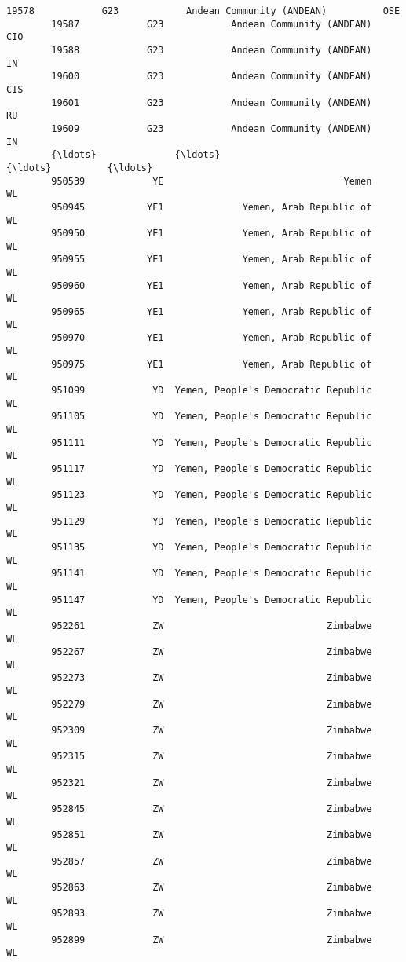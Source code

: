 \documentclass[11pt]{article}
\begin{document}
\begin{Verbatim}[commandchars=\\\{\}]
        19578            G23            Andean Community (ANDEAN)          OSE   
        19587            G23            Andean Community (ANDEAN)          CIO   
        19588            G23            Andean Community (ANDEAN)           IN   
        19600            G23            Andean Community (ANDEAN)          CIS   
        19601            G23            Andean Community (ANDEAN)           RU   
        19609            G23            Andean Community (ANDEAN)           IN   
        {\ldots}              {\ldots}                                  {\ldots}          {\ldots}   
        950539            YE                                Yemen           WL   
        950945           YE1              Yemen, Arab Republic of           WL   
        950950           YE1              Yemen, Arab Republic of           WL   
        950955           YE1              Yemen, Arab Republic of           WL   
        950960           YE1              Yemen, Arab Republic of           WL   
        950965           YE1              Yemen, Arab Republic of           WL   
        950970           YE1              Yemen, Arab Republic of           WL   
        950975           YE1              Yemen, Arab Republic of           WL   
        951099            YD  Yemen, People's Democratic Republic           WL   
        951105            YD  Yemen, People's Democratic Republic           WL   
        951111            YD  Yemen, People's Democratic Republic           WL   
        951117            YD  Yemen, People's Democratic Republic           WL   
        951123            YD  Yemen, People's Democratic Republic           WL   
        951129            YD  Yemen, People's Democratic Republic           WL   
        951135            YD  Yemen, People's Democratic Republic           WL   
        951141            YD  Yemen, People's Democratic Republic           WL   
        951147            YD  Yemen, People's Democratic Republic           WL   
        952261            ZW                             Zimbabwe           WL   
        952267            ZW                             Zimbabwe           WL   
        952273            ZW                             Zimbabwe           WL   
        952279            ZW                             Zimbabwe           WL   
        952309            ZW                             Zimbabwe           WL   
        952315            ZW                             Zimbabwe           WL   
        952321            ZW                             Zimbabwe           WL   
        952845            ZW                             Zimbabwe           WL   
        952851            ZW                             Zimbabwe           WL   
        952857            ZW                             Zimbabwe           WL   
        952863            ZW                             Zimbabwe           WL   
        952893            ZW                             Zimbabwe           WL   
        952899            ZW                             Zimbabwe           WL   
        

\end{Verbatim}
\end{document}
